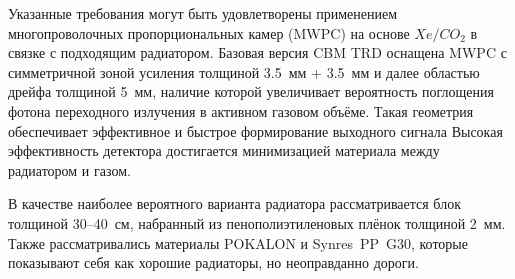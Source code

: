 Указанные требования могут быть удовлетворены применением многопроволочных пропорциональных камер (MWPC) на основе $ Xe/CO_{2} $ в связке с подходящим радиатором. Базовая версия CBM TRD оснащена MWPC с симметричной зоной усиления толщиной 3.5~мм + 3.5~мм и далее областью дрейфа толщиной 5~мм, наличие которой увеличивает вероятность поглощения фотона переходного излучения в активном газовом объёме. Такая геометрия обеспечивает эффективное и быстрое формирование выходного сигнала
Высокая эффективность детектора достигается минимизацией материала между радиатором и газом.


В качестве наиболее вероятного варианта радиатора рассматривается блок толщиной 30--40~см, набранный из пенополиэтиленовых плёнок толщиной 2~мм. Также рассматривались материалы POKALON и Synres~PP~G30, которые показывают себя как хорошие радиаторы, но неоправданно дороги.


